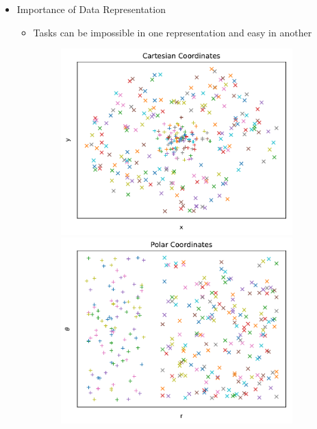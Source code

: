 \documentclass[t]{beamer}
\begin{document}
\begin{frame}
    \begin{itemize}
        \item Importance of Data Representation
        \begin{itemize}
            \item Tasks can be impossible in one representation and easy in another
            
            \begin{figure}
                \centering
                \begin{minipage}{0.45\textwidth}
                    \centering
                    \includegraphics[width=0.9\textwidth]{cartesian.pdf} %
                \end{minipage}\hfill
                \begin{minipage}{0.45\textwidth}
                    \centering
                    \includegraphics[width=0.9\textwidth]{polar.pdf} %
                \end{minipage}
            \end{figure}


\end{itemize}
\end{itemize}
\end{frame}
\end{document}
